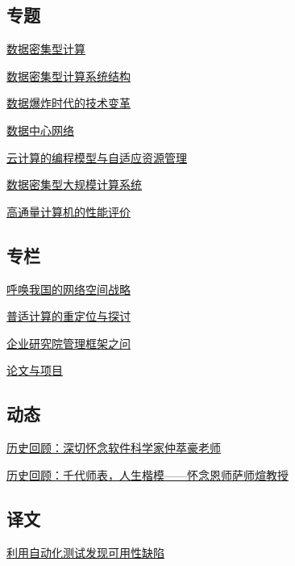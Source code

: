 \documentclass[a4paper]{article}
\begin{document}
\subsection{专题}
\href{http://history.ccf.org.cn/resources/1190201776262/2011/07/14/1.pdf}{数据密集型计算}

\href{http://history.ccf.org.cn/resources/1190201776262/2011/07/14/2.pdf}{数据密集型计算系统结构}

\href{http://history.ccf.org.cn/resources/1190201776262/2011/07/14/3.pdf}{数据爆炸时代的技术变革}

\href{http://history.ccf.org.cn/resources/1190201776262/2011/07/14/4.pdf}{数据中心网络}

\href{http://history.ccf.org.cn/resources/1190201776262/2011/07/14/5.pdf}{云计算的编程模型与自适应资源管理}

\href{http://history.ccf.org.cn/resources/1190201776262/2011/07/14/6.pdf}{数据密集型大规模计算系统}

\href{http://history.ccf.org.cn/resources/1190201776262/2011/07/14/7.pdf}{高通量计算机的性能评价}

\subsection{专栏}
\href{http://history.ccf.org.cn/resources/1190201776262/2011/07/14/8.pdf}{呼唤我国的网络空间战略}

\href{http://history.ccf.org.cn/resources/1190201776262/2011/07/14/9.pdf}{普适计算的重定位与探讨}

\href{http://history.ccf.org.cn/resources/1190201776262/2011/07/14/10.pdf}{企业研究院管理框架之问}

\href{http://history.ccf.org.cn/resources/1190201776262/2011/07/14/11.pdf}{论文与项目}

\subsection{动态}
\href{http://history.ccf.org.cn/resources/1190201776262/2011/07/14/13.pdf}{历史回顾：深切怀念软件科学家仲萃豪老师}

\href{http://history.ccf.org.cn/resources/1190201776262/2011/07/14/12.pdf}{历史回顾：千代师表，人生楷模——怀念恩师萨师煊教授}

\subsection{译文}
\href{http://history.ccf.org.cn/resources/1190201776262/2011/07/14/14.pdf}{利用自动化测试发现可用性缺陷}
\end{document}

